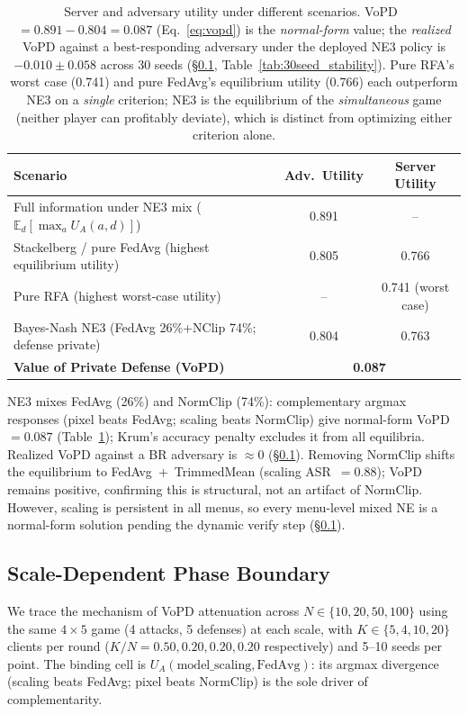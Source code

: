 \documentclass{article}
\newcommand{\UA}{U_A}
\begin{document}
\begin{table}[t]
\caption{Server and adversary utility under different scenarios. VoPD~$= 0.891 - 0.804 = 0.087$ (Eq.~\ref{eq:vopd}) is the \emph{normal-form} value; the \emph{realized} VoPD against a best-responding adversary under the deployed NE3 policy is $-0.010 \pm 0.058$ across 30 seeds (§\ref{sec:scale}, Table~\ref{tab:30seed_stability}). Pure RFA's worst case (0.741) and pure FedAvg's equilibrium utility (0.766) each outperform NE3 on a \emph{single} criterion; NE3 is the equilibrium of the \emph{simultaneous} game (neither player can profitably deviate), which is distinct from optimizing either criterion alone.}
\label{tab:vopd}
\centering
\small
\begin{tabular}{lcc}
\toprule
\textbf{Scenario} & \textbf{Adv.\ Utility} & \textbf{Server Utility} \\
\midrule
Full information under NE3 mix ($\mathbb{E}_d[\max_a U_A(a,d)]$) & 0.891 & -- \\
Stackelberg / pure FedAvg (highest equilibrium utility) & 0.805 & 0.766 \\
Pure RFA (highest worst-case utility) & -- & 0.741 (worst case) \\
Bayes-Nash NE3 (FedAvg 26\%+NClip 74\%; defense private) & 0.804 & 0.763 \\
\midrule
\textbf{Value of Private Defense (VoPD)} & \multicolumn{2}{c}{\textbf{0.087}} \\
\bottomrule
\end{tabular}
\end{table}

NE3 mixes FedAvg (26\%) and NormClip (74\%): complementary argmax responses (pixel beats FedAvg; scaling beats NormClip) give normal-form VoPD~$= 0.087$ (Table~\ref{tab:vopd}); Krum's accuracy penalty excludes it from all equilibria. Realized VoPD against a BR adversary is $\approx 0$ (§\ref{sec:scale}). Removing NormClip shifts the equilibrium to FedAvg~$+$~TrimmedMean (scaling ASR~$= 0.88$); VoPD remains positive, confirming this is structural, not an artifact of NormClip. However, scaling is persistent in all menus, so every menu-level mixed NE is a normal-form solution pending the dynamic verify step (§\ref{sec:scale}).

\subsection{Scale-Dependent Phase Boundary}
\label{sec:scale}

We trace the mechanism of VoPD attenuation across $N \in \{10, 20, 50, 100\}$ using the same $4{\times}5$ game (4 attacks, 5 defenses) at each scale, with $K \in \{5, 4, 10, 20\}$ clients per round ($K/N = 0.50, 0.20, 0.20, 0.20$ respectively) and 5--10 seeds per point. The binding cell is $\UA(\text{model\_scaling}, \text{FedAvg})$: its argmax divergence (scaling beats FedAvg; pixel beats NormClip) is the sole driver of complementarity.
\end{document}
